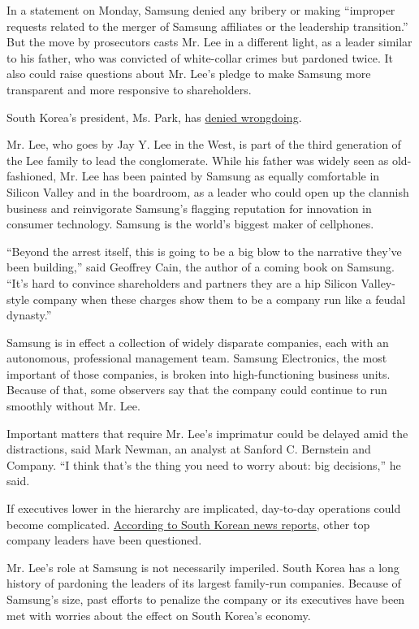 In a statement on Monday, Samsung denied any bribery or making
``improper requests related to the merger of Samsung affiliates or the
leadership transition.'' But the move by prosecutors casts Mr. Lee in a
different light, as a leader similar to his father, who was convicted of
white-collar crimes but pardoned twice. It also could raise questions
about Mr. Lee's pledge to make Samsung more transparent and more
responsive to shareholders.

South Korea's president, Ms. Park, has
\href{https://www.nytimes3xbfgragh.onion/2017/01/15/world/asia/south-korea-samsung-arrest-jay-lee-park-geun-hye.html}{denied
wrongdoing}.

Mr. Lee, who goes by Jay Y. Lee in the West, is part of the third
generation of the Lee family to lead the conglomerate. While his father
was widely seen as old-fashioned, Mr. Lee has been painted by Samsung as
equally comfortable in Silicon Valley and in the boardroom, as a leader
who could open up the clannish business and reinvigorate Samsung's
flagging reputation for innovation in consumer technology. Samsung is
the world's biggest maker of cellphones.

``Beyond the arrest itself, this is going to be a big blow to the
narrative they've been building,'' said Geoffrey Cain, the author of a
coming book on Samsung. ``It's hard to convince shareholders and
partners they are a hip Silicon Valley-style company when these charges
show them to be a company run like a feudal dynasty.''

Samsung is in effect a collection of widely disparate companies, each
with an autonomous, professional management team. Samsung Electronics,
the most important of those companies, is broken into high-functioning
business units. Because of that, some observers say that the company
could continue to run smoothly without Mr. Lee.

Important matters that require Mr. Lee's imprimatur could be delayed
amid the distractions, said Mark Newman, an analyst at Sanford C.
Bernstein and Company. ``I think that's the thing you need to worry
about: big decisions,'' he said.

If executives lower in the hierarchy are implicated, day-to-day
operations could become complicated.
\href{http://english.yonhapnews.co.kr/news/2017/01/16/0200000000AEN20170116001453315.html}{According
to South Korean news reports}, other top company leaders have been
questioned.

Mr. Lee's role at Samsung is not necessarily imperiled. South Korea has
a long history of pardoning the leaders of its largest family-run
companies. Because of Samsung's size, past efforts to penalize the
company or its executives have been met with worries about the effect on
South Korea's economy.

